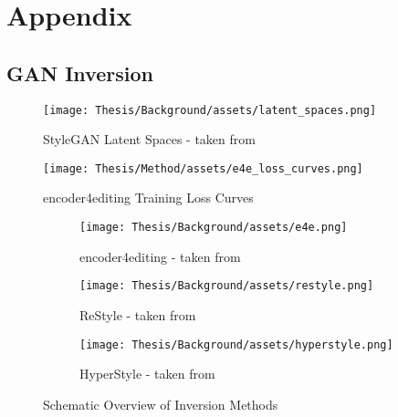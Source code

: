 \appendix
{}%
\section*{Appendix}

\renewcommand{\thefigure}{A.\arabic{figure}}

\FloatBarrier
\subsection*{GAN Inversion}
\begin{figure}[!ht]
    \centering
    \texttt{[image: Thesis/Background/assets/latent\_spaces.png]}
    \caption[StyleGAN Latent Spaces]{StyleGAN Latent Spaces - taken from \cite{bermano2022state}}
    \label{fig:latent_spaces}
\end{figure}

\begin{figure}[!ht]
    \centering
    \texttt{[image: Thesis/Method/assets/e4e\_loss\_curves.png]}
    \caption{encoder4editing Training Loss Curves}
    \label{fig:e4e_loss_curves}
\end{figure}

\begin{figure}[!ht]
     \centering
     \begin{subfigure}[b]{1\textwidth}
         \centering
         \texttt{[image: Thesis/Background/assets/e4e.png]}
         \caption{encoder4editing - taken from \cite{tov2021designing}}
         \label{fig:e4e}
     \end{subfigure}
     \hfill
     \begin{subfigure}[b]{1\textwidth}
         \centering
         \texttt{[image: Thesis/Background/assets/restyle.png]}
         \caption{ReStyle - taken from \cite{alaluf2021restyle}}
         \label{fig:restyle}
     \end{subfigure}
     \hfill
     \begin{subfigure}[b]{1\textwidth}
         \centering
         \texttt{[image: Thesis/Background/assets/hyperstyle.png]}
         \caption{HyperStyle - taken from \cite{alaluf2022hyperstyle}}
         \label{fig:hyperstyle}
     \end{subfigure}
        \caption{Schematic Overview of Inversion Methods}
        \label{fig:inversion_methods}
\end{figure}


